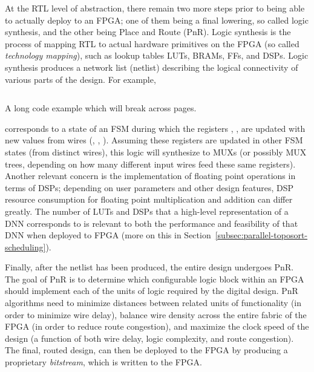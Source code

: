 At the RTL level of abstraction, there remain two more steps prior to being able to actually deploy to an FPGA; one of them being a final lowering, so called logic synthesis, and the other being Place and Route (PnR).
Logic synthesis is the process of mapping RTL to actual hardware primitives on the FPGA (so called \emph{technology mapping}), such as lookup tables LUTs, BRAMs, FFs, and DSPs.
Logic synthesis produces a network list (netlist) describing the logical connectivity of various parts of the design.
For example,
\begin{longlisting}
	\inputminted[autogobble,xleftmargin=0.2\columnwidth,xrightmargin=0.2\columnwidth,frame=lines]{verilog}{sources/always.v}
	\caption[Long Code Example]{A long code example which will break across pages.}
	\label{lst:long}
\end{longlisting}
\noindent corresponds to a state of an FSM during which the registers , ,  are updated with new values from wires (, , ).
Assuming these registers are updated in other FSM states (from distinct wires), this logic will synthesize to MUXs (or possibly MUX trees, depending on how many different input wires feed these same registers).
Another relevant concern is the implementation of floating point operations in terms of DSPs; depending on user parameters and other design features, DSP resource consumption for floating point multiplication and addition can differ greatly.
The number of LUTs and DSPs that a high-level representation of a DNN corresponds to is relevant to both the performance and feasibility of that DNN when deployed to FPGA (more on this in Section~\ref{subsec:parallel-toposort-scheduling}).

Finally, after the netlist has been produced, the entire design undergoes PnR.
The goal of PnR is to determine which configurable logic block within an FPGA should implement each of the units of logic required by the digital design.
PnR algorithms need to minimize distances between related units of functionality (in order to minimize wire delay), balance wire density across the entire fabric of the FPGA (in order to reduce route congestion), and maximize the clock speed of the design (a function of both wire delay, logic complexity, and route congestion).
The final, routed design, can then be deployed to the FPGA by producing a proprietary \emph{bitstream}, which is written to the FPGA.

